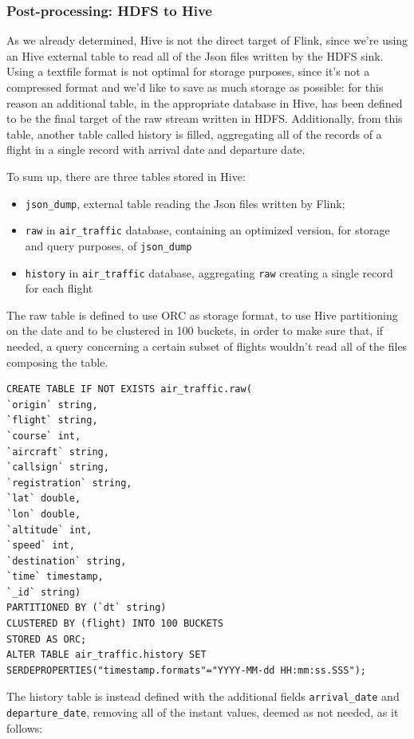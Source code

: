\subsubsection{Post-processing: HDFS to Hive}

As we already determined, Hive is not the direct target of Flink, since we're using an Hive external table to read all of the Json files written by the HDFS sink. Using a textfile format is not optimal for storage purposes, since it's not a compressed format and we'd like to save as much storage as possible: for this reason an additional table, in the appropriate database in Hive, has been defined to be the final target of the raw stream written in HDFS. Additionally, from this table, another table called history is filled, aggregating all of the records of a flight in a single record with arrival date and departure date.

To sum up, there are three tables stored in Hive:
\begin{itemize}
    \item \texttt{json\_dump}, external table reading the Json files written by Flink;
    \item \texttt{raw} in \texttt{air\_traffic} database, containing an optimized version, for storage and query purposes, of \texttt{json\_dump} 
    \item \texttt{history} in \texttt{air\_traffic} database, aggregating \texttt{raw} creating a single record for each flight
\end{itemize}

The raw table is defined to use ORC as storage format, to use Hive partitioning on the date and to be clustered in 100 buckets, in order to make sure that, if needed, a query concerning a certain subset of flights wouldn't read all of the files composing the table.

\begin{verbatim}
CREATE TABLE IF NOT EXISTS air_traffic.raw(
`origin` string,
`flight` string,
`course` int,
`aircraft` string,
`callsign` string,
`registration` string,
`lat` double,
`lon` double,
`altitude` int,
`speed` int,
`destination` string,
`time` timestamp,
`_id` string)
PARTITIONED BY (`dt` string)
CLUSTERED BY (flight) INTO 100 BUCKETS
STORED AS ORC;
ALTER TABLE air_traffic.history SET SERDEPROPERTIES("timestamp.formats"="YYYY-MM-dd HH:mm:ss.SSS");
\end{verbatim}

The history table is instead defined with the additional fields \texttt{arrival\_date} and \texttt{departure\_date}, removing all of the instant values, deemed as not needed, as it follows:

